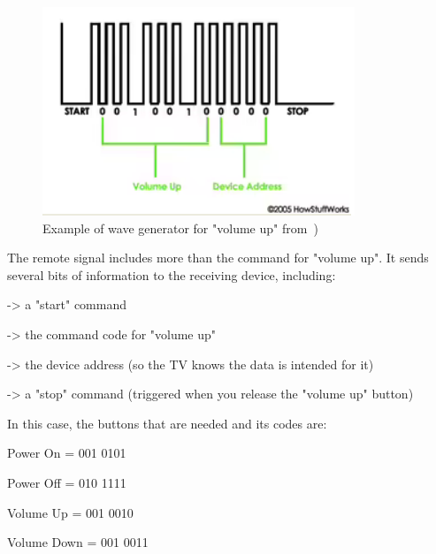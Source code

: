 \begin{figure}
\centering
    \includegraphics[width=0.9\columnwidth]{./img/buttoncode.png}
  \caption{Example of wave generator for "volume up" from~\cite{btncode})}%
\label{fig:btncode}
\end{figure}

The remote signal includes more than the command for "volume up". It sends several bits of information to the receiving device, including:

-> a "start" command

-> the command code for "volume up"

-> the device address (so the TV knows the data is intended for it)

-> a "stop" command (triggered when you release the "volume up" button)

In this case, the buttons that are needed and its codes are:

Power On = 001 0101

Power Off = 010 1111

Volume Up = 001 0010

Volume Down = 001 0011

